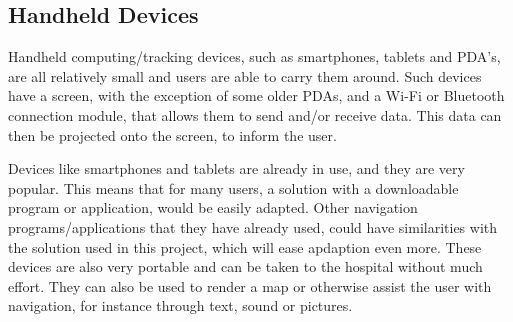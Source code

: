 
\subsection{Handheld Devices} %
\label{sub:device}

 	 
Handheld computing/tracking devices, such as smartphones, tablets and PDA's, are all relatively small and users are able to carry them around. Such devices have a screen, with the exception of some older PDAs, and a Wi-Fi or Bluetooth connection module, that allows them to send and/or receive data. This data can then be projected onto the screen, to inform the user.

Devices like smartphones and tablets are already in use, and they are very popular. This means that for many users, a solution with a downloadable program or application, would be easily adapted. Other navigation programs/applications that they have already used, could have similarities with the solution used in this project, which will ease apdaption even more. These devices are also very portable and can be taken to the hospital without much effort. They can also be used to render a map or otherwise assist the user with navigation, for instance through text, sound or pictures.

